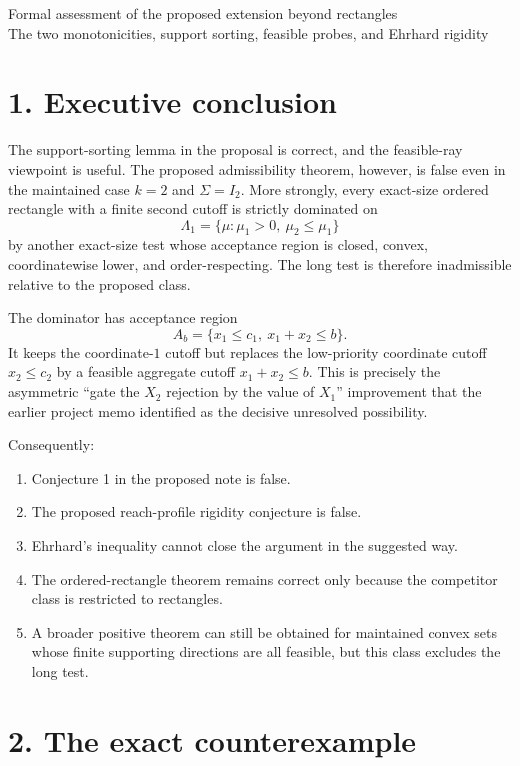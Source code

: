\documentclass[12pt]{article}
\theoremstyle{definition}
\theoremstyle{remark}
\begin{document}
\begin{center}
{\LARGE Formal assessment of the proposed extension beyond rectangles}\\[4pt]
{\large The two monotonicities, support sorting, feasible probes, and Ehrhard rigidity}
\end{center}

\section*{1. Executive conclusion}

The support-sorting lemma in the proposal is correct, and the feasible-ray viewpoint is useful.  The proposed admissibility theorem, however, is false even in the maintained case $k=2$ and $\Sigma=I_2$.  More strongly, every exact-size ordered rectangle with a finite second cutoff is strictly dominated on
\[
\Lambda_1=\{\mu:\mu_1>0,\ \mu_2\le\mu_1\}
\]
by another exact-size test whose acceptance region is closed, convex, coordinatewise lower, and order-respecting.  The long test is therefore inadmissible relative to the proposed class.

The dominator has acceptance region
\[
A_b=\{x_1\le c_1,\ x_1+x_2\le b\}.
\]
It keeps the coordinate-$1$ cutoff but replaces the low-priority coordinate cutoff $x_2\le c_2$ by a feasible aggregate cutoff $x_1+x_2\le b$.  This is precisely the asymmetric ``gate the $X_2$ rejection by the value of $X_1$'' improvement that the earlier project memo identified as the decisive unresolved possibility.

Consequently:
\begin{enumerate}[label=(\roman*),leftmargin=2.2em]
\item Conjecture 1 in the proposed note is false.
\item The proposed reach-profile rigidity conjecture is false.
\item Ehrhard's inequality cannot close the argument in the suggested way.
\item The ordered-rectangle theorem remains correct only because the competitor class is restricted to rectangles.
\item A broader positive theorem can still be obtained for maintained convex sets whose finite supporting directions are all feasible, but this class excludes the long test.
\end{enumerate}

\section*{2. The exact counterexample}
\end{document}

